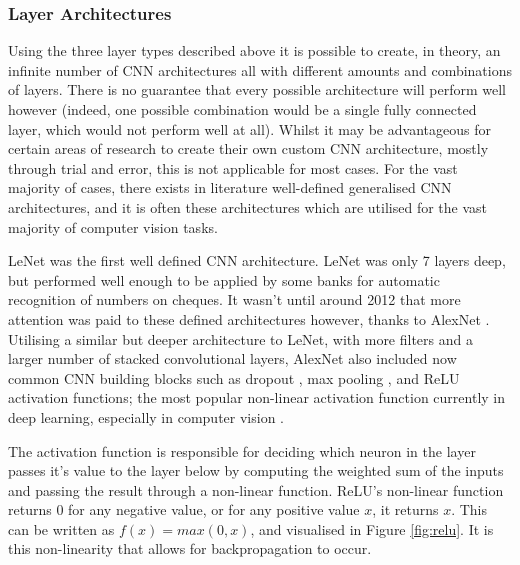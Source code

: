 \subsubsection{Layer Architectures}\label{ch:Background,sec:CNN,sub:CNN,subsub:layerArchitecture}
Using the three layer types described above it is possible to create, in theory, an infinite number of CNN architectures all with different amounts and combinations of layers. There is no guarantee that every possible architecture will perform well however (indeed, one possible combination would be a single fully connected layer, which would not perform well at all). Whilst it may be advantageous for certain areas of research to create their own custom CNN architecture, mostly through trial and error, this is not applicable for most cases. For the vast majority of cases, there exists in literature well-defined generalised CNN architectures, and it is often these architectures which are utilised for the vast majority of computer vision tasks. 

LeNet \cite{lecun_gradient-based_1998} was the first well defined CNN architecture. LeNet was only 7 layers deep, but performed well enough to be applied by some banks for automatic recognition of numbers on cheques. It wasn't until around 2012 that more attention was paid to these defined architectures however, thanks to AlexNet \cite{krizhevsky_imagenet_2012}. Utilising a similar but deeper architecture to LeNet, with more filters and a larger number of stacked convolutional layers, AlexNet also included now common CNN building blocks such as dropout \cite{srivastava_dropout:_2014}, max pooling \cite{boureau_theoretical_2010}, and ReLU activation functions; the most popular non-linear activation function currently in deep learning, especially in computer vision \cite{he_delving_2015}. 

The activation function is responsible for deciding which neuron in the layer passes it's value to the layer below by computing the weighted sum of the inputs and passing the result through a non-linear function. ReLU's non-linear function returns 0 for any negative value, or for any positive value $x$, it returns $x$. This can be written as $f(x) = max(0,x)$, and visualised in Figure \ref{fig:relu}. It is this non-linearity that allows for backpropagation to occur.

